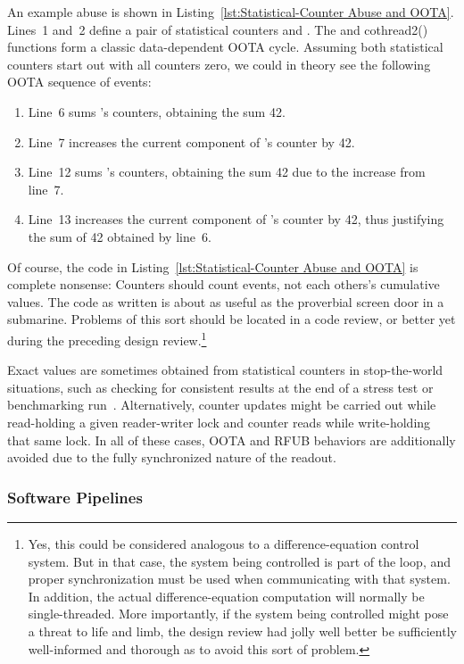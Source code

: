 \documentclass[10]{article}
\begin{document}
An example abuse is shown in
Listing~\ref{lst:Statistical-Counter Abuse and OOTA}.
Lines~1 and~2 define a pair of statistical counters  and .
The  and co{thread2()} functions form a classic
data-dependent OOTA cycle.
Assuming both statistical counters start out with all counters zero,
we could in theory see the following OOTA sequence of events:

\begin{enumerate}
\item	Line~6 sums 's counters, obtaining the sum 42.
\item	Line~7 increases the current component of 's counter by 42.
\item	Line~12 sums 's counters, obtaining the sum 42 due to the
	increase from line~7.
\item	Line~13 increases the current component of 's counter by 42,
	thus justifying the sum of 42 obtained by line~6.
\end{enumerate}

Of course, the code in
Listing~\ref{lst:Statistical-Counter Abuse and OOTA}
is complete nonsense: Counters should count events, not each others's
cumulative values.
The code as written is about as useful as the proverbial screen door in
a submarine.
Problems of this sort should be located in a code review, or better yet
during the preceding design review.\footnote{
	Yes, this could be considered analogous to a difference-equation
	control system.
	But in that case, the system being controlled is part of the
	loop, and proper synchronization must be used when communicating
	with that system.
	In addition, the actual difference-equation computation will
	normally be single-threaded.
	More importantly, if the system being controlled might pose a threat
	to life and limb, the design review had jolly well better be
	sufficiently well-informed and thorough as to avoid this sort
	of problem.}

Exact values are sometimes obtained from statistical counters in
stop-the-world situations, such as checking for consistent results
at the end of a stress test or benchmarking
run~\cite[Sections 5.3 and 5.4]{McKenney2018ParallelProgramming-2018-12-08a}.
Alternatively, counter updates might be carried out while read-holding
a given reader-writer lock and counter reads while write-holding
that same lock.
In all of these cases, OOTA and RFUB behaviors are additionally avoided due
to the fully synchronized nature of the readout.

\subsubsection{Software Pipelines}
\label{sec:Software Pipelines}
\end{document}
